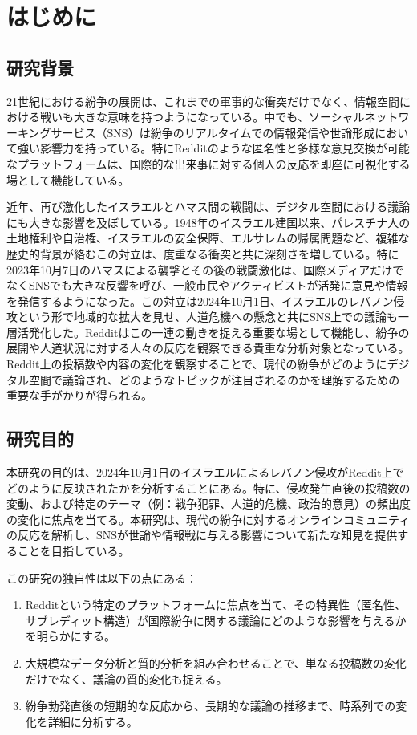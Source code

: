 \documentclass[11pt, a4j]{jreport}
\begin{document}
    \chapter{はじめに} %

    \section{研究背景} %
    21世紀における紛争の展開は、これまでの軍事的な衝突だけでなく、情報空間における戦いも大きな意味を持つようになっている。中でも、ソーシャルネットワーキングサービス（SNS）は紛争のリアルタイムでの情報発信や世論形成において強い影響力を持っている。特にRedditのような匿名性と多様な意見交換が可能なプラットフォームは、国際的な出来事に対する個人の反応を即座に可視化する場として機能している。

    近年、再び激化したイスラエルとハマス間の戦闘は、デジタル空間における議論にも大きな影響を及ぼしている。1948年のイスラエル建国以来、パレスチナ人の土地権利や自治権、イスラエルの安全保障、エルサレムの帰属問題など、複雑な歴史的背景が絡むこの対立は、度重なる衝突と共に深刻さを増している。特に2023年10月7日のハマスによる襲撃とその後の戦闘激化は、国際メディアだけでなくSNSでも大きな反響を呼び、一般市民やアクティビストが活発に意見や情報を発信するようになった。この対立は2024年10月1日、イスラエルのレバノン侵攻という形で地域的な拡大を見せ、人道危機への懸念と共にSNS上での議論も一層活発化した。Redditはこの一連の動きを捉える重要な場として機能し、紛争の展開や人道状況に対する人々の反応を観察できる貴重な分析対象となっている。Reddit上の投稿数や内容の変化を観察することで、現代の紛争がどのようにデジタル空間で議論され、どのようなトピックが注目されるのかを理解するための重要な手がかりが得られる。

    \section{研究目的}
    本研究の目的は、2024年10月1日のイスラエルによるレバノン侵攻がReddit上でどのように反映されたかを分析することにある。特に、侵攻発生直後の投稿数の変動、および特定のテーマ（例：戦争犯罪、人道的危機、政治的意見）の頻出度の変化に焦点を当てる。本研究は、現代の紛争に対するオンラインコミュニティの反応を解析し、SNSが世論や情報戦に与える影響について新たな知見を提供することを目指している。

    この研究の独自性は以下の点にある：

    \begin{enumerate}
        \item Redditという特定のプラットフォームに焦点を当て、その特異性（匿名性、サブレディット構造）が国際紛争に関する議論にどのような影響を与えるかを明らかにする。

        \item 大規模なデータ分析と質的分析を組み合わせることで、単なる投稿数の変化だけでなく、議論の質的変化も捉える。

        \item 紛争勃発直後の短期的な反応から、長期的な議論の推移まで、時系列での変化を詳細に分析する。
    \end{enumerate}
\end{document}
